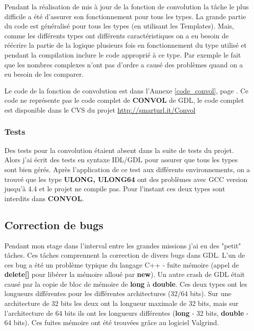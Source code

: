 Pendant la réalisation de mis à jour de la fonction de convolution la tâche le plus difficile a été d'assurer son fonctionnement pour tous les types. La grande partie du code est généralisé pour tous les types (en utilisant les Templates). Mais, comme les différents types ont différents caractéristiques on a eu besoin de réécrire la partie de la logique plusieurs fois en fonctionnement du type utilisé et pendant la compilation inclure le code approprié à ce type. Par exemple le fait que les nombres complexes n'ont pas d'ordre a causé des problèmes quand on a eu besoin de les comparer.

Le code de la fonction de convolution est dans l'Annexe \ref{code_convol}, page \pageref{code_convol}. Ce code ne représente pas le code complet de \textbf{CONVOL} de GDL, le code complet est disponible dans le CVS du projet \url{http://smarturl.it/Convol}

\subsubsection{Tests}

Des tests pour la convolution étaient absent dans la suite de tests du projet. Alors j'ai écrit des tests en syntaxe IDL/GDL pour assurer que tous les types sont bien gérés. Après l'application de ce test aux différents environnements, on a trouvé que les type \textbf{ULONG, ULONG64} ont des problèmes avec GCC version jusqu'à 4.4 et le projet ne compile pas. Pour l'instant ces deux types sont interdits dans \textbf{CONVOL}.

\subsection{Correction de bugs}

Pendant mon stage dans l’interval entre les grandes missions j'ai eu des "petit" tâches. Ces tâches comprennent la correction de divers bugs dans GDL. L'un de ces bug a été un problème typique du langage C++ - fuite mémoire (appel de \textbf{delete[]} pour libérer la mémoire alloué par \textbf{new}). Un autre crash de GDL était causé par la copie de bloc de mémoire de \textbf{long} à \textbf{double}. Ces deux types ont les longueurs différentes pour les différentes architectures (32/64 bits). Sur une architecture de 32 bits les deux ont la longueur maximale de 32 bits, mais sur l'architecture de 64 bits ils ont les longueurs différentes (\textbf{long} - 32 bits, \textbf{double} - 64 bits). Ces fuites mémoire ont été trouvées grâce au logiciel Valgrind.

